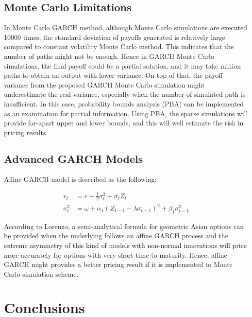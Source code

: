 \documentclass[10pt, a4paper, twocolumn]{article} %
\begin{document}
\subsection{Monte Carlo Limitations}

In Monte Carlo GARCH method, although Monte Carlo simulations are executed 10000 times, the standard deviation of payoffs generated is relatively large compared to constant volatility Monte Carlo method. This indicates that the number of paths might not be enough. Hence in GARCH Monte Carlo simulations, the final payoff could be a partial solution, and it may take million paths to obtain an output with lower variance. On top of that, the payoff variance from the proposed GARCH Monte Carlo simulation might underestimate the real variance, especially when the number of simulated path is insufficient. In this case, probability bounds analysis (PBA) can be implemented as an examination for partial information. Using PBA, the sparse simulations will provide far-apart upper and lower bounds, and this will well estimate the risk in pricing results.

\subsection{Advanced GARCH Models}

Affine GARCH model is described as the following:

\begin{equation}
\begin{aligned}
r_t &= r - \frac 12 \sigma_t^2 + \sigma_t Z_t
\\
\sigma_t^2 &= \omega + \alpha_1 (Z_{t-1} -\lambda \sigma_{t-1})^2+\beta_1 \sigma_{t-1}^2
\end{aligned}
\end{equation}

According to Lorenzo, a semi-analytical formula for geometric Asian options can be provided when the underlying follows an affine GARCH process and the extreme asymmetry of this kind of models with non-normal innovations will price more accurately for options with very short time to maturity\citep{lorenzo2011pricing}. Hence, affine GARCH might provides a better pricing result if it is implemented to Monte Carlo simulation scheme.



\section{Conclusions}
\end{document}
